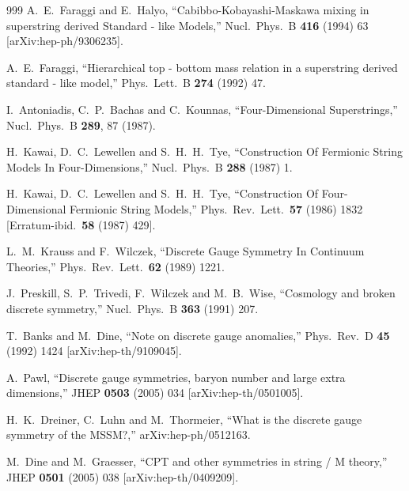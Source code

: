 \begin{thebibliography}{999}
  A.~E.~Faraggi and E.~Halyo,
  ``Cabibbo-Kobayashi-Maskawa mixing in superstring derived Standard - like
  Models,''
  Nucl.\ Phys.\ B {\bf 416} (1994) 63
  [arXiv:hep-ph/9306235].

  A.~E.~Faraggi,
  ``Hierarchical top - bottom mass relation in a superstring derived standard -
  like model,''
  Phys.\ Lett.\ B {\bf 274} (1992) 47.

  I.~Antoniadis, C.~P.~Bachas and C.~Kounnas,
  ``Four-Dimensional Superstrings,''
  Nucl.\ Phys.\ B {\bf 289}, 87 (1987).

  H.~Kawai, D.~C.~Lewellen and S.~H.~H.~Tye,
  ``Construction Of Fermionic String Models In Four-Dimensions,''
  Nucl.\ Phys.\ B {\bf 288} (1987) 1.

  H.~Kawai, D.~C.~Lewellen and S.~H.~H.~Tye,
  ``Construction Of Four-Dimensional Fermionic String Models,''
  Phys.\ Rev.\ Lett.\  {\bf 57} (1986) 1832
  [Erratum-ibid.\  {\bf 58} (1987) 429].

  L.~M.~Krauss and F.~Wilczek,
  ``Discrete Gauge Symmetry In Continuum Theories,''
  Phys.\ Rev.\ Lett.\  {\bf 62} (1989) 1221.

  J.~Preskill, S.~P.~Trivedi, F.~Wilczek and M.~B.~Wise,
  ``Cosmology and broken discrete symmetry,''
  Nucl.\ Phys.\ B {\bf 363} (1991) 207.

  T.~Banks and M.~Dine,
  ``Note on discrete gauge anomalies,''
  Phys.\ Rev.\ D {\bf 45} (1992) 1424
  [arXiv:hep-th/9109045].

  A.~Pawl,
  ``Discrete gauge symmetries, baryon number and large extra dimensions,''
  JHEP {\bf 0503} (2005) 034
  [arXiv:hep-th/0501005].

  H.~K.~Dreiner, C.~Luhn and M.~Thormeier,
  ``What is the discrete gauge symmetry of the MSSM?,''
  arXiv:hep-ph/0512163.

  M.~Dine and M.~Graesser,
  ``CPT and other symmetries in string / M theory,''
  JHEP {\bf 0501} (2005) 038
  [arXiv:hep-th/0409209].


\end{thebibliography}
